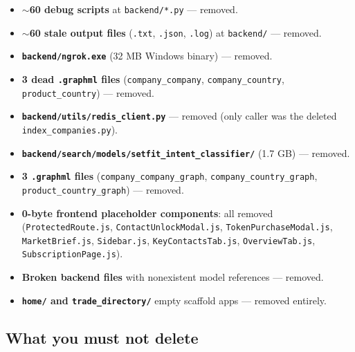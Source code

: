 \documentclass[10pt,a4paper]{article}
\begin{document}
\begin{itemize}[leftmargin=1.2cm]
  \item \textbf{$\sim$60 debug scripts} at \texttt{backend/*.py} --- removed.
  \item \textbf{$\sim$60 stale output files} (\texttt{.txt}, \texttt{.json}, \texttt{.log}) at \texttt{backend/} --- removed.
  \item \textbf{\texttt{backend/ngrok.exe}} (32 MB Windows binary) --- removed.
  \item \textbf{3 dead \texttt{.graphml} files} (\texttt{company\_company}, \texttt{company\_country}, \texttt{product\_country}) --- removed.
  \item \textbf{\texttt{backend/utils/redis\_client.py}} --- removed (only caller was the deleted \texttt{index\_companies.py}).
  \item \textbf{\texttt{backend/search/models/setfit\_intent\_classifier/}} (1.7 GB) --- removed.
  \item \textbf{3 \texttt{.graphml} files} (\texttt{company\_company\_graph}, \texttt{company\_country\_graph}, \texttt{product\_country\_graph}) --- removed.
  \item \textbf{0-byte frontend placeholder components}: all removed (\texttt{ProtectedRoute.js}, \texttt{ContactUnlockModal.js}, \texttt{TokenPurchaseModal.js}, \texttt{MarketBrief.js}, \texttt{Sidebar.js}, \texttt{KeyContactsTab.js}, \texttt{OverviewTab.js}, \texttt{SubscriptionPage.js}).
  \item \textbf{Broken backend files} with nonexistent model references --- removed.
  \item \textbf{\texttt{home/} and \texttt{trade\_directory/}} empty scaffold apps --- removed entirely.
\end{itemize}

\subsection{What you must not delete}
\end{document}
